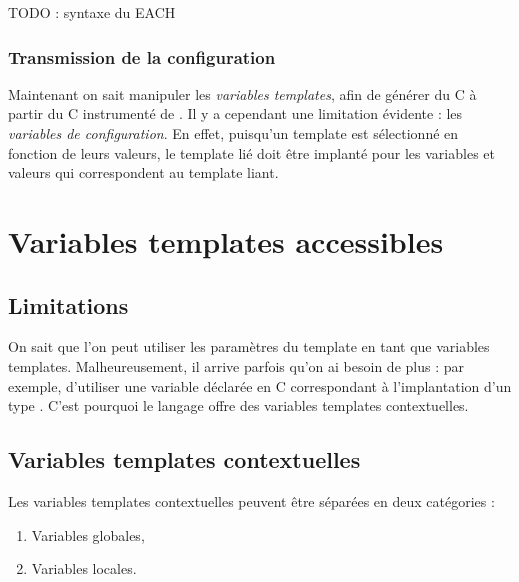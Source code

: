 \documentclass[french]{rtxreport}
\begin{document}
TODO : syntaxe du EACH



\subsection{Transmission de la configuration}

Maintenant on sait manipuler les \emph{variables templates}, afin de générer du
C à partir du C instrumenté de \rtx. Il y a cependant une limitation évidente :
les \emph{variables de configuration}. En effet, puisqu'un template est
sélectionné en fonction de leurs valeurs, le template lié doit être implanté
pour les variables et valeurs qui correspondent au template liant.


\chapter{Variables templates accessibles}


\section{Limitations}

On sait que l'on peut utiliser les paramètres du template en tant que variables
templates. Malheureusement, il arrive parfois qu'on ai besoin de plus : par
exemple, d'utiliser une variable déclarée en C correspondant à l'implantation 
d'un type \rtx. C'est pourquoi le langage offre des variables templates
contextuelles.


\section{Variables templates contextuelles}

Les variables templates contextuelles peuvent être séparées en deux catégories :
\begin{enumerate}
    \item Variables globales,
    \item Variables locales.
\end{enumerate}
\end{document}
